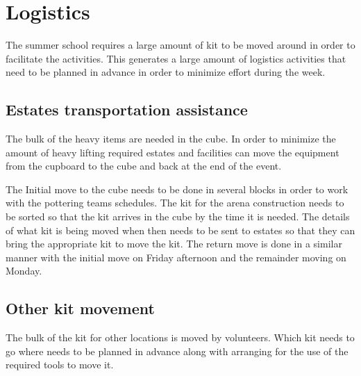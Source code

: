 \section{Logistics}

The summer school requires a large amount of kit to be moved around in order to facilitate the activities.
This generates a large amount of logistics activities that need to be planned in advance in order to minimize effort during the week.

\subsection{Estates transportation assistance}

The bulk of the heavy items are needed in the cube.
In order to minimize the amount of heavy lifting required estates and facilities can move the equipment from the cupboard to the cube and back at the end of the event.

The Initial move to the cube needs to be done in several blocks in order to work with the pottering teams schedules.
The kit for the arena construction needs to be sorted so that the kit arrives in the cube by the time it is needed.
The details of what kit is being moved when then needs to be sent to estates so that they can bring the appropriate kit to move the kit.
The return move is done in a similar manner with the initial move on Friday afternoon and the remainder moving on Monday.


\subsection{Other kit movement}

The bulk of the kit for other locations is moved by volunteers.
Which kit needs to go where needs to be planned in advance along with arranging for the use of the required tools to move it.


